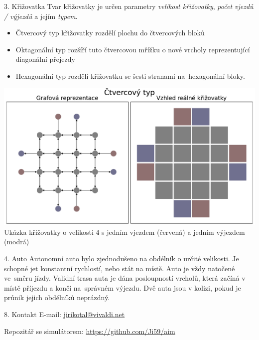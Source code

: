 \documentclass[portrait,fontscale=0.26,paperwidth=842mm,paperheight=1185mm]{baposter}
\begin{document}
\begin{poster}
\begin{posterbox}[column=0, name=krizovatka, below=cile]{3. Křižovatka}
			Tvar křižovatky je určen parametry \textit{velikost křižovatky}, \textit{počet vjezdů / výjezdů} a jejím \textit{typem}.
			\begin{itemize}
				\item Čtvercový typ křižovatky rozdělí plochu do čtvercových bloků
				\item Oktagonální typ rozšíří tuto čtvercovou mřížku o nové vrcholy reprezentující diagonální přejezdy
				\item Hexagonální typ rozdělí křižovatku se šesti stranami na~hexagonální bloky.
			\end{itemize}

			\begin{center}
				\includegraphics[width=\linewidth]{img/Square_grid}
				Ukázka křižovatky o velikosti 4 s jedním vjezdem (červená) a jedním výjezdem (modrá)
			\end{center}
		\end{posterbox}

		\begin{posterbox}[column=0, name=auto, below=krizovatka]{4. Auto}
			Autonomní auto bylo zjednodušeno na obdélník o určité velikosti.
			Je schopné jet konstantní rychlostí, nebo stát na místě.
			Auto je vždy natočené ve~směru jízdy.
			Validní trasa auta je dána posloupností vrcholů, která začíná v místě příjezdu a končí na~správném výjezdu.
			Dvě auta jsou v kolizi, pokud je průnik jejich obdélníků neprázdný.
		\end{posterbox}

		\begin{posterbox}[column=0, name=kontakt, below=auto]{8. Kontakt}
			E-mail: \href{jirikotal@vivaldi.net}{jirikotal@vivaldi.net}

			Repozitář se simulátorem: \href{https://github.com/Ji59/aim}{https://github.com/Ji59/aim}
		\end{posterbox}
%
%
%


\end{poster}
\end{document}
